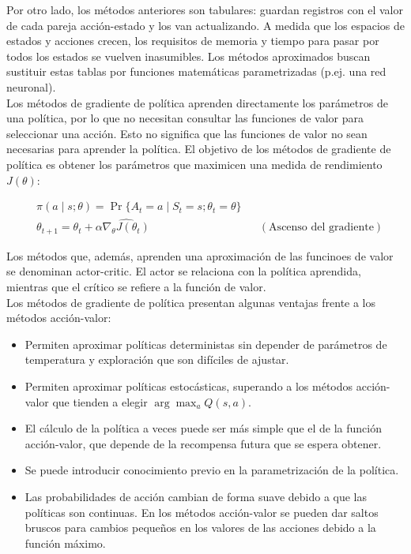 \documentclass[11pt,a4paper]{article}
\begin{document}
		Por otro lado, los métodos anteriores son tabulares: guardan registros con el valor de cada pareja acción-estado y los van actualizando. A medida que los espacios de estados y acciones crecen, los requisitos de memoria y tiempo para pasar por todos los estados se vuelven inasumibles. Los métodos aproximados buscan sustituir estas tablas por funciones matemáticas parametrizadas (p.ej. una red neuronal). \\
		
		Los métodos de gradiente de política aprenden directamente los parámetros de una política, por lo que no necesitan consultar las funciones de valor para seleccionar una acción. Esto no significa que las funciones de valor no sean necesarias para aprender la política. El objetivo de los métodos de gradiente de política es obtener los parámetros que maximicen una medida de rendimiento $J(\theta)$:
		
		\begin{align}
		& \pi(a \mid s ; \theta) = \Pr\{A_t = a \mid S_t = s; \theta_t = \theta \} \\
		& \theta_{t+1} = \theta_t + \alpha \widehat{\nabla_\theta J(\theta_t)} && (\text{Ascenso del gradiente})
		\end{align}
		
		Los métodos que, además, aprenden una aproximación de las funcinoes de valor se denominan actor-critic. El actor se relaciona con la política aprendida, mientras que el crítico se refiere a la función de valor. \\
		
		Los métodos de gradiente de política presentan algunas ventajas frente a los métodos acción-valor:
		
		\begin{itemize}
			\item Permiten aproximar políticas deterministas sin depender de parámetros de temperatura y exploración que son difíciles de ajustar.
			\item Permiten aproximar políticas estocásticas, superando a los métodos acción-valor que tienden a elegir $\arg\max_aQ(s,a)$.
			\item El cálculo de la política a veces puede ser más simple que el de la función acción-valor, que depende de la recompensa futura que se espera obtener.
			\item Se puede introducir conocimiento previo en la parametrización de la política.
			\item Las probabilidades de acción cambian de forma suave debido a que las políticas son continuas. En los métodos acción-valor se pueden dar saltos bruscos para cambios pequeños en los valores de las acciones debido a la función máximo.
		\end{itemize}
		
\end{document}
